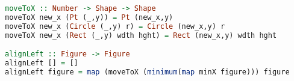 \begin{lstlisting}[language=haskell]
moveToX :: Number -> Shape -> Shape
moveToX new_x (Pt (_,y)) = Pt (new_x,y)
moveToX new_x (Circle (_,y) r) = Circle (new_x,y) r
moveToX new_x (Rect (_,y) wdth hght) = Rect (new_x,y) wdth hght

alignLeft :: Figure -> Figure
alignLeft [] = []
alignLeft figure = map (moveToX (minimum(map minX figure))) figure
\end{lstlisting}